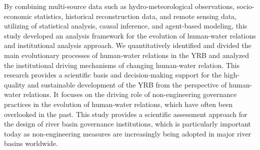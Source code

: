 \begin{eabstract}
  By combining multi-source data such as hydro-meteorological observations, socio-economic statistics, historical reconstruction data, and remote sensing data, utilizing of statistical analysis, causal inference, and agent-based modeling, this study developed an analysis framework for the evolution of human-water relations and institutional analysis approach. 
  We quantitatively identified and divided the main evolutionary processes of human-water relations in the YRB and analyzed the institutional driving mechanisms of changing human-water relation.
  This research provides a scientific basis and decision-making support for the high-quality and sustainable development of the YRB from the perspective of human-water relations. 
  It focuses on the driving role of non-engineering governance practices in the evolution of human-water relations, which have often been overlooked in the past. 
  This study provides a scientific assessment approach for the design of river basin governance institutions, which is particularly important today as non-engineering measures are increasingly being adopted in major river basins worldwide.
\end{eabstract}


